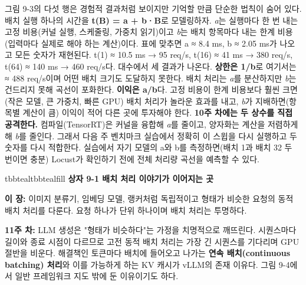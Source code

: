 그림 9-3의 다섯 행은 경험적 결과처럼 보이지만 기억할 만큼 단순한 법칙이 숨어 있다. 배치 실행 하나의 시간을 \textbf{t(B) = a + b·B}로 모델링하자. \textit{a}는 실행마다 한 번 내는 고정 비용(커널 실행, 스케줄링, 가중치 읽기)이고 \textit{b}는 배치 항목마다 내는 한계 비용(입력마다 실제로 해야 하는 계산)이다. 표에 맞추면 a ≈ 8.4 ms, b ≈ 2.05 ms가 나오고 모든 숫자가 재현된다. t(1) ≈ 10.5 ms → 95 req/s, t(16) ≈ 41 ms → 380 req/s, t(64) ≈ 140 ms → 460 req/s다. 대수에서 세 결과가 나온다. \textbf{상한은 1/b}로 여기서는 ≈ 488 req/s이며 어떤 배치 크기도 도달하지 못한다. 배치 처리는 \textit{a}를 분산하지만 \textit{b}는 건드리지 못해 곡선이 포화한다. \textbf{이익은 a/b}다. 고정 비용이 한계 비용보다 훨씬 크면(작은 모델, 큰 가중치, 빠른 GPU) 배치 처리가 놀라운 효과를 내고, \textit{b}가 지배하면(항목별 계산이 큼) 이익이 적어 다른 곳에 투자해야 한다. \textbf{10주 차에는 두 상수를 직접 공격한다.} 컴파일(TensorRT)은 커널을 융합해 \textit{a}를 줄이고, 양자화는 계산을 저렴하게 해 \textit{b}를 줄인다. 그래서 다음 주 벤치마크 실습에서 정확히 이 스윕을 다시 실행하고 두 숫자를 다시 적합한다. 실습에서 자기 모델의 a와 b를 측정하면(배치 1과 배치 32 두 번이면 충분) Locust가 확인하기 전에 전체 처리량 곡선을 예측할 수 있다.

\begin{calloutbox}{tbbteal}{tbbtealfill}
{\normalsize\bfseries\color{tbbx115E59}상자 9-1  배치 처리 이야기가 이어지는 곳}\par\vspace{3pt}
\textbf{이 장:} 이미지 분류기, 임베딩 모델, 랭커처럼 독립적이고 형태가 비슷한 요청의 동적 배치 처리를 다룬다. 요청 하나가 단위 하나이며 배치 처리는 투명하다.

\textbf{11주 차:} LLM 생성은 "형태가 비슷하다"는 가정을 치명적으로 깨뜨린다. 시퀀스마다 길이와 종료 시점이 다르므로 고전 동적 배치 처리는 가장 긴 시퀀스를 기다리며 GPU 절반을 비운다. 해결책인 토큰마다 배치에 들어오고 나가는 \textbf{연속 배치(continuous batching) 처리}와 이를 가능하게 하는 KV 캐시가 vLLM의 존재 이유다. 그림 9-4에서 일반 프레임워크 지도 밖에 둔 이유이기도 하다.
\end{calloutbox}

\vspace{3.0pt}

